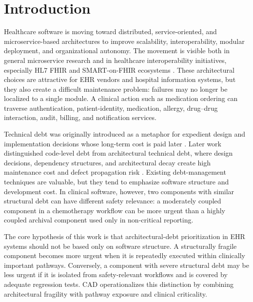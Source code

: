 \documentclass[english,preprint]{elsarticle}
\newcommand{\CAD}{\textsc{CAD}\xspace}
\begin{document}
\section{Introduction}\label{sec:introduction}

Healthcare software is moving toward distributed, service-oriented, and microservice-based architectures to improve scalability, interoperability, modular deployment, and organizational autonomy. The movement is visible both in general microservice research and in healthcare interoperability initiatives, especially HL7 FHIR and SMART-on-FHIR ecosystems \cite{Newman2015Microservices,Dragoni2017Microservices,Soldani2018PainsGains,Taibi2017Microservices,FHIR2026,Mandel2016SMART}. These architectural choices are attractive for EHR vendors and hospital information systems, but they also create a difficult maintenance problem: failures may no longer be localized to a single module. A clinical action such as medication ordering can traverse authentication, patient-identity, medication, allergy, drug--drug interaction, audit, billing, and notification services.

Technical debt was originally introduced as a metaphor for expedient design and implementation decisions whose long-term cost is paid later \cite{Cunningham1992WyCash,Kruchten2012TechnicalDebt,Li2015TechnicalDebt}. Later work distinguished code-level debt from architectural technical debt, where design decisions, dependency structures, and architectural decay create high maintenance cost and defect propagation risk \cite{Alves2016TechnicalDebt,Rios2018TertiaryStudy,Verdecchia2021Landscape,Martini2015ATD,Xiao2016ArchitecturalDebt,Soliman2021DesignDecisions,Verdecchia2021Theory}. Existing debt-management techniques are valuable, but they tend to emphasize software structure and development cost. In clinical software, however, two components with similar structural debt can have different safety relevance: a moderately coupled component in a chemotherapy workflow can be more urgent than a highly coupled archival component used only in non-critical reporting.

The core hypothesis of this work is that architectural-debt prioritization in EHR systems should not be based only on software structure. A structurally fragile component becomes more urgent when it is repeatedly executed within clinically important pathways. Conversely, a component with severe structural debt may be less urgent if it is isolated from safety-relevant workflows and is covered by adequate regression tests. \CAD operationalizes this distinction by combining architectural fragility with pathway exposure and clinical criticality.
\end{document}
